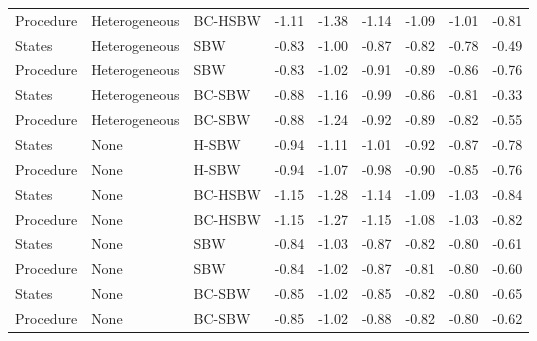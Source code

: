 \begin{table}[ht]
\begin{tabular}{lllrrrrrr}
  Procedure & Heterogeneous & BC-HSBW & -1.11 & -1.38 & -1.14 & -1.09 & -1.01 & -0.81 \\ 
  States & Heterogeneous & SBW & -0.83 & -1.00 & -0.87 & -0.82 & -0.78 & -0.49 \\ 
  Procedure & Heterogeneous & SBW & -0.83 & -1.02 & -0.91 & -0.89 & -0.86 & -0.76 \\ 
  States & Heterogeneous & BC-SBW & -0.88 & -1.16 & -0.99 & -0.86 & -0.81 & -0.33 \\ 
  Procedure & Heterogeneous & BC-SBW & -0.88 & -1.24 & -0.92 & -0.89 & -0.82 & -0.55 \\ 
  States & None & H-SBW & -0.94 & -1.11 & -1.01 & -0.92 & -0.87 & -0.78 \\ 
  Procedure & None & H-SBW & -0.94 & -1.07 & -0.98 & -0.90 & -0.85 & -0.76 \\ 
  States & None & BC-HSBW & -1.15 & -1.28 & -1.14 & -1.09 & -1.03 & -0.84 \\ 
  Procedure & None & BC-HSBW & -1.15 & -1.27 & -1.15 & -1.08 & -1.03 & -0.82 \\ 
  States & None & SBW & -0.84 & -1.03 & -0.87 & -0.82 & -0.80 & -0.61 \\ 
  Procedure & None & SBW & -0.84 & -1.02 & -0.87 & -0.81 & -0.80 & -0.60 \\ 
  States & None & BC-SBW & -0.85 & -1.02 & -0.85 & -0.82 & -0.80 & -0.65 \\ 
  Procedure & None & BC-SBW & -0.85 & -1.02 & -0.88 & -0.82 & -0.80 & -0.62 \\ 
   \hline
\end{tabular}
\end{table}

